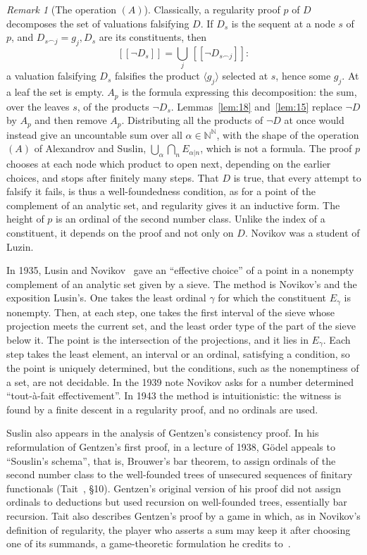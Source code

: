 \documentclass[11pt]{amsart}
\theoremstyle{definition}
\theoremstyle{remark}
\newtheorem{remark}[theorem]{Remark}
\newcommand{\seq}[1]{\langle #1\rangle}
\newcommand{\N}{\mathbb{N}}
\begin{document}
\begin{remark}[The operation $(A)$]\label{rem:A}
  Classically, a regularity proof $p$ of $D$ decomposes the set of
  valuations falsifying $D$. If $D_s$ is the sequent at a node $s$ of $p$,
  and $D_{s\frown j}=g_j,D_s$ are its constituents, then
  \[
    [\![\neg D_s]\!]=\bigcup_j\,[\![\neg D_{s\frown j}]\!]:
  \]
  a valuation falsifying $D_s$ falsifies the product $\seq{g_j}$ selected at
  $s$, hence some $g_j$. At a leaf the set is empty. $A_p$ is the formula
  expressing this decomposition: the sum, over the leaves $s$, of the
  products $\neg D_s$. Lemmas~\ref{lem:18} and~\ref{lem:15} replace $\neg D$
  by $A_p$ and then remove $A_p$. Distributing all the products of $\neg D$
  at once would instead give an uncountable sum over all
  $\alpha\in\N^\N$, with the shape of the operation $(A)$ of Alexandrov and
  Suslin, $\bigcup_\alpha\bigcap_nE_{\alpha|n}$, which is not a formula. The
  proof $p$ chooses at each node which product to open next, depending on
  the earlier choices, and stops after finitely many steps. That $D$ is
  true, that every attempt to falsify it fails, is thus a well-foundedness
  condition, as for a point of the complement of an analytic set, and
  regularity gives it an inductive form. The height of $p$ is an ordinal of
  the second number class. Unlike the index of a constituent, it depends on
  the proof and not only on $D$. Novikov was a student of Luzin.

  In 1935, Lusin and Novikov~\cite{LusinNovikov} gave an ``effective
  choice'' of a point in a nonempty complement of an analytic set given by
  a sieve. The method is Novikov's and the exposition Lusin's. One takes
  the least ordinal $\gamma$ for which the constituent $E_\gamma$ is
  nonempty. Then, at each step, one takes the first interval of the sieve
  whose projection meets the current set, and the least order type of the
  part of the sieve below it. The point is the intersection of the
  projections, and it lies in $E_\gamma$. Each step takes the least element,
  an interval or an ordinal, satisfying a condition, so the point is
  uniquely determined, but the conditions, such as the nonemptiness of a
  set, are not decidable. In the 1939 note Novikov asks for a number
  determined ``tout-\`a-fait effectivement''. In 1943 the method is
  intuitionistic: the witness is found by a finite descent in a regularity
  proof, and no ordinals are used.

  Suslin also appears in the analysis of Gentzen's consistency proof. In
  his reformulation of Gentzen's first proof, in a lecture of 1938, Gödel
  appeals to ``Souslin's schema'', that is, Brouwer's bar theorem, to assign
  ordinals of the second number class to the well-founded trees of
  unsecured sequences of finitary functionals (Tait~\cite{Tait05}, \S10).
  Gentzen's original version
  of his proof did not assign ordinals to deductions but used recursion on
  well-founded trees, essentially bar recursion. Tait also describes
  Gentzen's proof by a game in which, as in Novikov's definition of
  regularity, the player who asserts a sum may keep it after choosing one of
  its summands, a game-theoretic formulation he credits
  to~\cite{Coquand}.
\end{remark}
\end{document}
